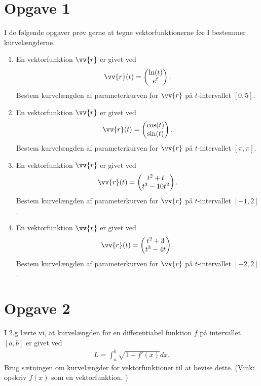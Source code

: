 \section*{Opgave 1}
I de følgende opgaver prøv gerne at tegne vektorfunktionerne før I bestemmer kurvelængderne. 
\begin{enumerate}[label=\roman*)]
	\item En vektorfunktion $\vv{r}$ er givet ved
	\begin{align*}
		\vv{r}(t) = 
		\begin{pmatrix}
			\ln(t) \\
			e^t
		\end{pmatrix}.
	\end{align*}
	Bestem kurvelængden af parameterkurven for $\vv{r}$ på $t$-intervallet $[0,5]$.
	\item En vektorfunktion $\vv{r}$ er givet ved
	\begin{align*}
		\vv{r}(t) = 
		\begin{pmatrix}
			\cos(t) \\
			\sin(t)
		\end{pmatrix}.
	\end{align*}
	Bestem kurvelængden af parameterkurven for $\vv{r}$ på $t$-intervallet $[\pi,\pi]$. 
	\item En vektorfunktion $\vv{r}$ er givet ved
	\begin{align*}
		\vv{r}(t) = 
		\begin{pmatrix}
			t^2+t \\
			t^3-10t^2
		\end{pmatrix}.
	\end{align*}
	Bestem kurvelængden af parameterkurven for $\vv{r}$ på $t$-intervallet $[-1,2]$. 
	\item En vektorfunktion $\vv{r}$ er givet ved
	\begin{align*}
		\vv{r}(t) = 
		\begin{pmatrix}
			t^2+3 \\
			t^3-4t
		\end{pmatrix}.
	\end{align*}
	Bestem kurvelængden af parameterkurven for $\vv{r}$ på $t$-intervallet $[-2,2]$. 
\end{enumerate}

\section*{Opgave 2}
I 2.g lærte vi, at kurvelængden for en differentiabel funktion $f$ på intervallet $[a,b]$ er givet ved
\begin{align*}
	L = \int_a^b \sqrt{1+f'(x)}dx.
\end{align*}
Brug sætningen om kurvelængder for vektorfunktioner til at bevise dette. (Vink: opskriv $f(x)$ som en vektorfunktion. )
